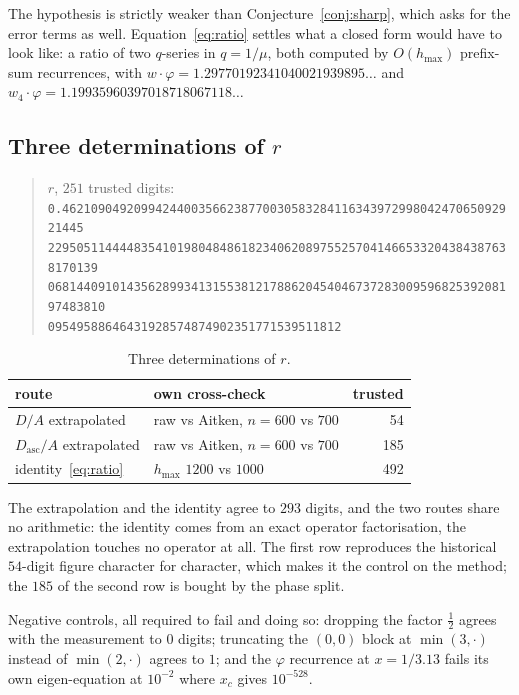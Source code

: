 \documentclass[11pt]{article}
\begin{document}
The hypothesis is strictly weaker than Conjecture~\ref{conj:sharp}, which asks
for the error terms as well. Equation~\eqref{eq:ratio} settles what a closed form would have to look like: a ratio of two $q$-series in $q = 1/\mu$, both computed
by $O(h_{\max})$ prefix-sum recurrences, with
$w\cdot\varphi = 1.29770192341040021939895\dots$ and
$w_4\cdot\varphi = 1.19935960397018718067118\dots$

\subsection{Three determinations of \texorpdfstring{$r$}{r}}

\begin{quote}\small
$r$, $251$ trusted digits:\\[2pt]
\texttt{0.4621090492099424400356623877003058328411634397299804247065092921445}\\
\texttt{22950511444483541019804848618234062089755257041466533204384387638170139}\\
\texttt{068144091014356289934131553812178862045404673728300959682539208197483810}\\
\texttt{09549588646431928574874902351771539511812}
\end{quote}

\begin{table}[H]
\centering\small
\begin{tabular}{l l r}
\toprule
route & own cross-check & trusted \\
\midrule
$D/A$ extrapolated & raw vs Aitken, $n=600$ vs $700$ & 54 \\
$D_{\mathrm{asc}}/A$ extrapolated & raw vs Aitken, $n=600$ vs $700$ & 185 \\
identity~\eqref{eq:ratio} & $h_{\max}$ $1200$ vs $1000$ & 492 \\
\bottomrule
\end{tabular}
\caption{Three determinations of $r$.}
\label{tab:ratio}
\end{table}

The extrapolation and the identity agree to $293$ digits, and the two routes
share no arithmetic: the identity comes from an exact operator factorisation,
the extrapolation touches no operator at all. The first row reproduces the
historical $54$-digit figure character for character, which makes it the control
on the method; the $185$ of the second row is bought by the phase split.

Negative controls, all required to fail and doing so: dropping the factor
$\tfrac12$ agrees with the measurement to $0$ digits; truncating the $(0,0)$
block at $\min(3,\cdot)$ instead of $\min(2,\cdot)$ agrees to $1$; and the
$\varphi$ recurrence at $x = 1/3.13$ fails its own eigen-equation at $10^{-2}$
where $x_c$ gives $10^{-528}$.
\end{document}
